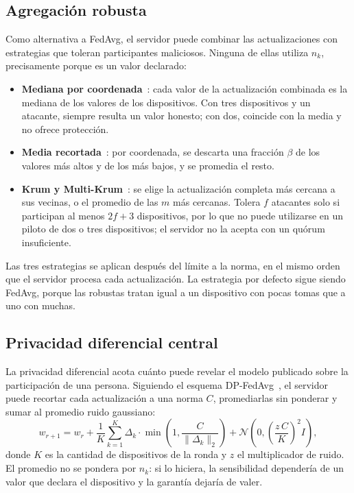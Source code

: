 \subsection{Agregación robusta}

Como alternativa a FedAvg, el servidor puede combinar las actualizaciones con estrategias que toleran participantes maliciosos. Ninguna de ellas utiliza $n_k$, precisamente porque es un valor declarado:

\begin{itemize}
    \item \textbf{Mediana por coordenada}~\cite{yin2018byzantine}: cada valor de la actualización combinada es la mediana de los valores de los dispositivos. Con tres dispositivos y un atacante, siempre resulta un valor honesto; con dos, coincide con la media y no ofrece protección.
    \item \textbf{Media recortada}~\cite{yin2018byzantine}: por coordenada, se descarta una fracción $\beta$ de los valores más altos y de los más bajos, y se promedia el resto.
    \item \textbf{Krum y Multi-Krum}~\cite{blanchard2017krum}: se elige la actualización completa más cercana a sus vecinas, o el promedio de las $m$ más cercanas. Tolera $f$ atacantes solo si participan al menos $2f + 3$ dispositivos, por lo que no puede utilizarse en un piloto de dos o tres dispositivos; el servidor no la acepta con un quórum insuficiente.
\end{itemize}

Las tres estrategias se aplican después del límite a la norma, en el mismo orden que el servidor procesa cada actualización. La estrategia por defecto sigue siendo FedAvg, porque las robustas tratan igual a un dispositivo con pocas tomas que a uno con muchas.

\subsection{Privacidad diferencial central}

La privacidad diferencial acota cuánto puede revelar el modelo publicado sobre la participación de una persona. Siguiendo el esquema DP-FedAvg~\cite{mcmahan2018dp}, el servidor puede recortar cada actualización a una norma $C$, promediarlas sin ponderar y sumar al promedio ruido gaussiano:
\begin{equation}
    w_{r+1} = w_r + \frac{1}{K}\sum_{k=1}^{K} \Delta_k \cdot \min\left(1, \frac{C}{\lVert \Delta_k \rVert_2}\right) + \mathcal{N}\!\left(0, \left(\frac{z\,C}{K}\right)^{2} I\right),
\end{equation}
donde $K$ es la cantidad de dispositivos de la ronda y $z$ el multiplicador de ruido. El promedio no se pondera por $n_k$: si lo hiciera, la sensibilidad dependería de un valor que declara el dispositivo y la garantía dejaría de valer.

